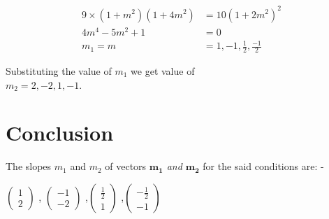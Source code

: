 \documentclass[conference]{IEEEtran}
\let\vec\mathbf
\newcommand{\myvec}[1]{\ensuremath{\begin{pmatrix}#1\end{pmatrix}}}
\begin{document}
\begin{align}
9 \times (1 + m^2) (1 + 4 m^2) & = 10 ( 1 + 2 m^2)^2\\ 
4 m^4 - 5 m^2 + 1 &=0\\ 
m_{1} = m &= 1, -1,\frac{1}{2},\frac{-1}{2}
\end{align}

Substituting the value of $ m_{1}$ we get value of\\
$ m_{2} = 2, -2, 1, -1$.\\

\section{Conclusion}
The slopes $ m_{1}$ and $ m_{2} $ of vectors \textit{$\vec{m_{1}}$  and    $\vec{m_{2}}$} for the said conditions are: -
 \begin{center}
\myvec{1 \\ 2} , \myvec{-1 \\ -2} ,\myvec{ \frac{1}{2}\\1} ,\myvec{- \frac{1}{2}\\ -1}
\end{center}
\end{document}
